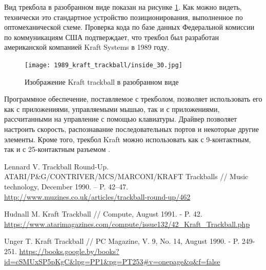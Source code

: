 \documentclass[11pt, a4paper]{article}
\begin{document}
Вид трекбола в разобранном виде показан на рисунке \ref{fig:KraftInside}. Как можно видеть, технически это стандартное устройство позиционирования, выполненное по оптомеханической схеме. Проверка кода по базе данных Федеральной комиссии по коммуникациям США подтверждает, что трекбол был разработан американской компанией Kraft Systems в 1989 году.

\begin{figure}[h]
    \centering
    \texttt{[image: 1989\_kraft\_trackball/inside\_30.jpg]}
    \caption{Изображение Kraft trackball в разобранном виде}
    \label{fig:KraftInside}
\end{figure}

Программное обеспечение, поставляемое с трекболом, позволяет использовать его как с приложениями, управляемыми мышью, так и с приложениями, рассчитанными на управление с помощью клавиатуры. Драйвер позволяет настроить скорость, распознавание последовательных портов и некоторые другие элементы. Кроме того, трекбол Kraft можно использовать как с 9-контактным, так и с 25-контактным разъемом \cite{Hudnall}.

\begin{thebibliography}{9}
 Lennard V. Trackball Round-Up. ATARI/P\&G/CONTRIVER/MCS/MARCONI/KRAFT Trackballs // Music technology, December 1990. -- P. 42--47. \url{http://www.muzines.co.uk/articles/trackball-round-up/462}

 Hudnall M. Kraft Trackball // Compute, August 1991. - P. 42. \url{https://www.atarimagazines.com/compute/issue132/42_Kraft_Trackball.php}

 Unger T. Kraft Trackball // PC Magazine, V. 9, No. 14, August 1990. - P. 249-251. \url{https://books.google.by/books?id=cSMUxSP5pKgC&lpg=PP1&pg=PT253#v=onepage&q&f=false}
\end{thebibliography}
\end{document}

